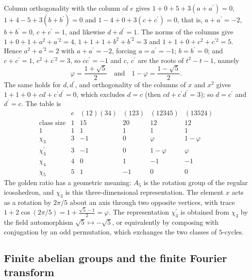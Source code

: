 \begin{example}
Column orthogonality with the column of $e$ gives $1 + 0 + 5 + 3(a + a^{\prime}) = 0$, $1 + 4 - 5 + 3(b + b^{\prime}) = 0$ and $1 - 4 + 0 + 3(c + c^{\prime}) = 0$, that is,
$a + a^{\prime} = -2$, $b + b^{\prime} = 0$, $c + c^{\prime} = 1$, and likewise $d + d^{\prime} = 1$. The norms of the columns give $1 + 0 + 1 + a^2 + a^{\prime2} = 4$, $1 + 1 + 1 + b^2 + b^{\prime2} = 3$ and
$1 + 1 + 0 + c^2 + c^{\prime2} = 5$. Hence $a^2 + a^{\prime2} = 2$ with $a + a^{\prime} = -2$, forcing $a = a^{\prime} = -1$; $b = b^{\prime} = 0$; and $c + c^{\prime} = 1$, $c^2 + c^{\prime2} = 3$, so $cc^{\prime} = -1$
and $c$, $c^{\prime}$ are the roots of $t^2 - t - 1$, namely
\[
\varphi = \frac{1 + \sqrt5}{2} \quad\text{and}\quad 1 - \varphi = \frac{1 - \sqrt5}{2}.
\]
The same holds for $d, d^{\prime}$, and orthogonality of the columns of $x$ and $x^2$ gives $1 + 1 + 0 + cd + c^{\prime}d^{\prime} = 0$, which excludes $d = c$ (then $cd + c^{\prime}d^{\prime} = 3$); so $d = c^{\prime}$ and
$d^{\prime} = c$. The table is
\[
\begin{array}{c|ccccc}
 & e & (12)(34) & (123) & (12345) & (13524)\\
\text{class size} & 1 & 15 & 20 & 12 & 12\\
\hline
1 & 1 & 1 & 1 & 1 & 1\\
\chi_3 & 3 & -1 & 0 & \varphi & 1 - \varphi\\
\chi_3^{\prime} & 3 & -1 & 0 & 1 - \varphi & \varphi\\
\chi_4 & 4 & 0 & 1 & -1 & -1\\
\chi_5 & 5 & 1 & -1 & 0 & 0
\end{array}
\]
The golden ratio has a geometric meaning: $A_5$ is the rotation group of the regular icosahedron, and $\chi_3$ is this three-dimensional representation. The element $x$ acts
as a rotation by $2\pi/5$ about an axis through two opposite vertices, with trace $1 + 2\cos(2\pi/5) = 1 + \frac{\sqrt5 - 1}{2} = \varphi$. The representation $\chi_3^{\prime}$ is obtained
from $\chi_3$ by the field automorphism $\sqrt5 \mapsto -\sqrt5$, or equivalently by composing with conjugation by an odd permutation, which exchanges the two classes of
$5$-cycles.
\end{example}

\subsection{Finite abelian groups and the finite Fourier transform}\label{representation-theory:subsection-abelian-characters}

